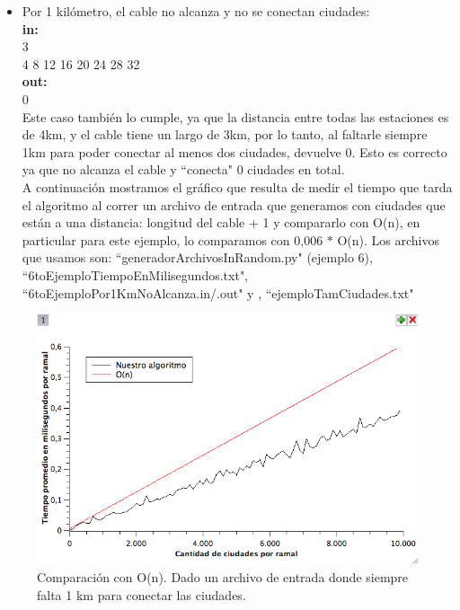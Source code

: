 \begin{itemize}
\item Por 1 kilómetro, el cable no alcanza y no se conectan ciudades:\\
\textbf{in:}\\ 
3\\
4 8 12 16 20 24 28 32 \\
\textbf{out:}\\
0\\

Este caso también lo cumple, ya que la distancia entre todas las estaciones es de 4km, y el cable tiene un largo de 3km, por lo tanto, al faltarle siempre 1km para poder conectar al menos dos ciudades, devuelve 0. Esto es correcto ya que no alcanza el cable y ``conecta" 0 ciudades en total. \\

A continuación mostramos el gráfico que resulta de medir el tiempo que tarda el algoritmo al correr un archivo de entrada que generamos con ciudades que están a una distancia: longitud del cable + 1 y compararlo con O(n), en particular para este ejemplo, lo comparamos con 0,006 $*$ O(n). Los archivos que usamos son: ``generadorArchivosInRandom.py" (ejemplo 6), ``6toEjemploTiempoEnMilisegundos.txt", ``6toEjemploPor1KmNoAlcanza.in/.out" y , ``ejemploTamCiudades.txt"\\

\end{itemize}

\begin{figure}[H]
\begin{center}

  \includegraphics[width=\linewidth]{../graficos/ej1/falta1KmSiempre.png}
  \caption{{\small Comparación con O(n). Dado un archivo de entrada donde siempre falta 1 km para conectar las ciudades.}} \label{ej1-tiempo-vs-falta-1-km-siempre}
\endminipage

\end{center}
\end{figure}

